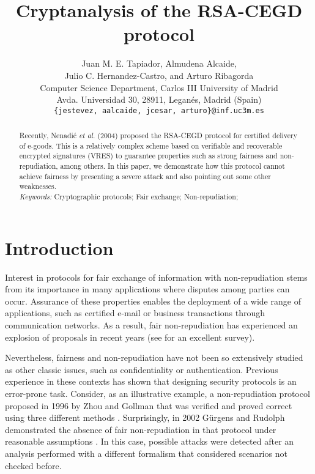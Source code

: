 \documentclass{article}
\begin{document}
\title{Cryptanalysis of the RSA-CEGD protocol}
\author{Juan M. E. Tapiador, Almudena Alcaide,\\
Julio C. Hernandez-Castro, and Arturo Ribagorda\\[2ex]
Computer Science Department, Carlos III University of Madrid\\
Avda. Universidad 30, 28911, Legan\'es, Madrid (Spain)\\
\texttt{\{jestevez, aalcaide, jcesar, arturo\}@inf.uc3m.es}}

\date{}
\maketitle
\begin{abstract}
Recently, Nenadi\'c \emph{et al.} (2004) proposed the RSA-CEGD
protocol for certified delivery of e-goods. This is a relatively
complex scheme based on verifiable and recoverable encrypted
signatures (VRES) to guarantee properties such as strong fairness
and non-repudiation, among others. In this paper, we demonstrate how
this protocol cannot achieve fairness by presenting a severe attack
and also pointing out some other weaknesses.\\

\noindent\emph{Keywords:} Cryptographic protocols; Fair exchange;
Non-repudiation;
\end{abstract}
\section{Introduction}\label{Sec:Introduction}
Interest in protocols for fair exchange of information with
non-repudiation stems from its importance in many applications where
disputes among parties can occur. Assurance of these properties
enables the deployment of a wide range of applications, such as
certified e-mail or business transactions through communication
networks. As a result, fair non-repudiation has experienced an
explosion of proposals in recent years (see \cite{KMZ02} for an
excellent survey).

Nevertheless, fairness and non-repudiation have not been so
extensively studied as other classic issues, such as confidentiality
or authentication. Previous experience in these contexts has shown
that designing security protocols is an error-prone task. Consider,
as an illustrative example, a non-repudiation protocol proposed in
1996 by Zhou and Gollman \cite{ZG96} that was verified and proved
correct using three different methods \cite{BP01,Sch98,ZG98}.
Surprisingly, in 2002 G\"urgens and Rudolph demonstrated the absence
of fair non-repudiation in that protocol under reasonable
assumptions \cite{GR02}. In this case, possible attacks were
detected after an analysis performed with a different formalism that
considered scenarios not checked before.
\end{document}
